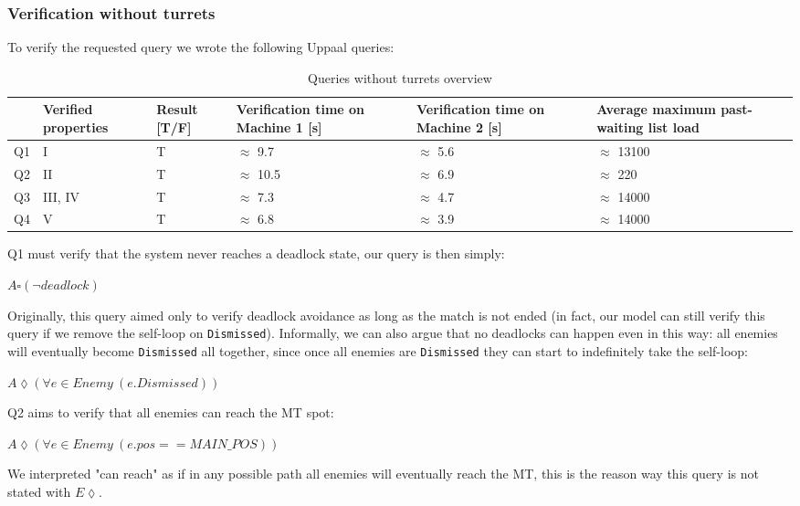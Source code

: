 \documentclass[
10pt, %
a4paper, %
oneside, %
headinclude,footinclude, %
BCOR5mm, %
]{scrartcl}
\begin{document}
			\subsubsection{Verification without turrets}
				To verify the requested query we wrote the following Uppaal queries:
				\begin{table}[H]
					\centering
					\begin{tabularx}{\textwidth}{||c|>{\raggedright\arraybackslash}X|>{\raggedright\arraybackslash}X|>{\raggedright\arraybackslash}X|>{\raggedright\arraybackslash}X|>{\raggedright\arraybackslash}X||}
						\hline
						 & Verified properties & Result [T/F] & Verification time on Machine 1 [s] & Verification time on Machine 2 [s] & Average maximum past-waiting list load \\
						\hline
						Q1 & I & T& $\approx$ 9.7 & $\approx$ 5.6& $\approx$ 13100\\ \hline
						Q2 & II & T&  $\approx$ 10.5 & $\approx$ 6.9 & $\approx$ 220\\ \hline
						Q3 & III, IV & T&  $\approx$ 7.3& $\approx$ 4.7 & $\approx$ 14000\\ \hline
						Q4 & V & T&  $\approx$ 6.8& $\approx$ 3.9 & $\approx$ 14000\\
						\hline
					\end{tabularx}
					\caption{Queries without turrets overview}
				\end{table}
				Q1 must verify that the system never reaches a deadlock state, our query is then simply:
				\begin{center}
					$A\square(\lnot deadlock)$
				\end{center}
				Originally, this query aimed only to verify deadlock avoidance as long as the match is not ended (in fact, our model can still verify this query if we remove the self-loop on \texttt{Dismissed}). Informally, we can also argue that no deadlocks can happen even in this way: all enemies will eventually become \texttt{Dismissed} all together, since once all enemies are \texttt{Dismissed} they can start to indefinitely take the self-loop:
				\begin{center}
					$A\lozenge(\forall e \in Enemy\ (e.Dismissed))$
				\end{center}
				
				Q2 aims to verify that all enemies can reach the MT spot:
				\begin{center}
					$A\lozenge(\forall e \in Enemy\ (e.pos==MAIN\_POS))$
				\end{center}
				We interpreted "can reach" as if in any possible path all enemies will eventually reach the MT, this is the reason way this query is not stated with $E\lozenge$.
				
\end{document}
